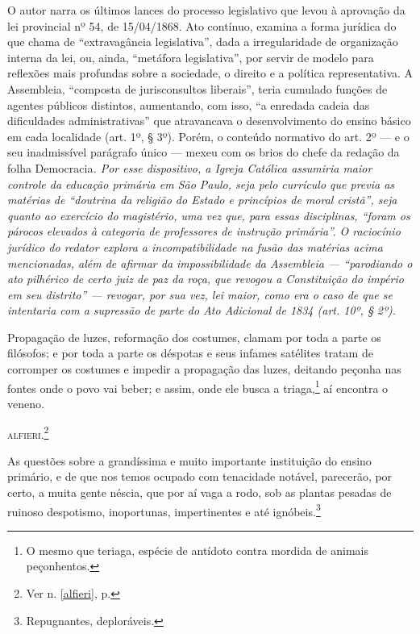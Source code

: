 \begin{didascalia}
O autor narra os últimos lances do processo legislativo que levou à
aprovação da lei provincial nº 54, de 15/04/1868. Ato contínuo, examina
a forma jurídica do que chama de ``extravagância legislativa'', dada a
irregularidade de organização interna da lei, ou, ainda, ``metáfora
legislativa'', por servir de modelo para reflexões mais profundas sobre a
sociedade, o direito e a política representativa. A Assembleia,
``composta de jurisconsultos liberais'', teria cumulado funções de agentes
públicos distintos, aumentando, com isso, ``a enredada cadeia das
dificuldades administrativas'' que atravancava o desenvolvimento do
ensino básico em cada localidade (art. 1º, § 3º). Porém, o conteúdo
normativo do art. 2º --- e o seu inadmissível parágrafo único --- mexeu
com os brios do chefe da redação da folha Democracia\emph{. Por esse
dispositivo, a Igreja Católica assumiria maior controle da educação
primária em São Paulo, seja pelo currículo que previa as matérias de
``doutrina da religião do Estado e princípios de moral cristã'', seja
quanto ao exercício do magistério, uma vez que, para essas disciplinas,
``foram os párocos elevados à categoria de professores de instrução
primária''. O raciocínio jurídico do redator explora a incompatibilidade
na fusão das matérias acima mencionadas, além de afirmar da
impossibilidade da Assembleia --- ``parodiando o ato pilhérico de certo
juiz de paz da roça, que revogou a Constituição do império em seu
distrito'' --- revogar, por sua vez, lei maior, como era o caso de que se
intentaria com a supressão de parte do Ato Adicional de 1834 (art. 10º,
§ 2º).}
\end{didascalia}



Propagação de luzes, reformação dos costumes, clamam por toda a parte os
filósofos; e por toda a parte os déspotas e seus infames satélites
tratam de corromper os costumes e impedir a propagação das luzes,
deitando peçonha nas fontes onde o povo vai beber; e assim, onde ele
busca a triaga,\footnote{O mesmo que teriaga, espécie de antídoto
  contra mordida de animais peçonhentos.} aí encontra o veneno.

\textsc{alfieri}.\footnote{Ver n. \ref{alfieri}, p. \pageref{alfieri}}

As questões sobre a grandíssima e muito importante instituição do ensino
primário, e de que nos temos ocupado com tenacidade notável, parecerão,
por certo, a muita gente néscia, que por aí vaga a rodo, sob as plantas
pesadas de ruinoso despotismo, inoportunas, impertinentes e até
ignóbeis.\footnote{Repugnantes, deploráveis.}

